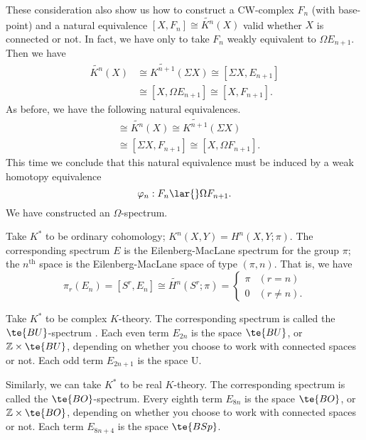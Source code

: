 \documentclass[../main]{subfiles}
\begin{document}
These consideration also show us how to construct a CW-complex $F_n$ (with base-point) and a natural equivalence $[X,F_n] \cong \widetilde{K^n}(X)$ valid whether $X$ is connected or not. In fact, we have only to take $F_n$ weakly equivalent to $\Omega E_{n+1}$. Then we have
    \begin{align*}
    \widetilde{K^n}(X)
    &\cong
    \widetilde{K^{n+1}}(\Sigma   X)
        \cong [\Sigma   X, E_{n+1}]
        \\
    &\cong
    [X, \Omega E_{n+1}]
        \cong [X, F_{n+1}].
    \end{align*}
As before, we have the following natural equivalences.
    \begin{align*}
    [X,F_n]
    &\cong
    \widetilde{K^n}(X)
        \cong \widetilde{K^{n+1}}(\Sigma   X)
        \\
    &\cong
    [\Sigma   X, F_{n+1}]
        \cong [X, \Omega F_{n+1}]. %
    \end{align*}
This time we conclude that this natural equivalence must be induced by a weak homotopy equivalence
\[
\varphi_n: F_n \lar{} \Omega F_{n+1}.
\]
We have constructed an $\Omega$-spectrum.

\begin{example} \label{ex:p3ch02.1}
Take $K^\ast$ to be ordinary cohomology; $K^n(X,Y)=H^n(X,Y;\pi)$. The corresponding spectrum $E$ is the Eilenberg-MacLane spectrum for the group $\pi$; the $n^{\text{th}}$ space is the Eilenberg-MacLane space  of type $(\pi,n)$. That is, we have
\[
\pi_r(E_n)
=
[S^r,E_n]
\cong
\widetilde{H^n}(S^r;\pi)
=
\begin{cases}
\pi &(r=n) \\
  0 &(r\neq n).
\end{cases}
\]
\end{example}

\begin{example} \label{ex:p3ch02.2}
Take $K^\ast$ to be complex $K$-theory. The corresponding spectrum is called the $\te{BU}$-spectrum . Each even term $E_{2n}$ is the space $\te{BU}$, or $\mathbb Z \times \te{BU}$, depending on whether you choose to work with connected spaces or not. Each odd term $E_{2n+1}$ is the space U.

Similarly, we can take $K^\ast$ to be real $K$-theory. The corresponding spectrum is called the $\te{BO}$-spectrum. Every eighth term $E_{8n}$ is the space $\te{BO}$, or $\mathbb Z \times \te{BO}$, depending on whether you choose to work with connected spaces or not. Each term $E_{8n+4}$ is the space $\te{BSp}$.
\end{example}
\end{document}
